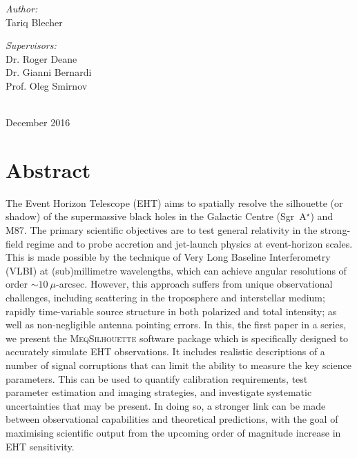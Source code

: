 \begin{titlepage}
\begin{minipage}{0.45\textwidth}
\begin{flushleft}\large 
\emph{Author:} \\
Tariq  {\sc Blecher}\\
\end{flushleft}
\end{minipage}
\begin{minipage}{0.45\textwidth}

\begin{flushright} \large
\emph{Supervisors:} \\
Dr. Roger {\sc Deane} \\
Dr. Gianni {\sc Bernardi} \\
Prof. Oleg {\sc Smirnov} \\
\end{flushright}
\end{minipage}\\[2cm]


{\large December 2016}

\end{titlepage}

\chapter*{Abstract}

 The Event Horizon Telescope (EHT) aims to spatially resolve the silhouette (or shadow) of the supermassive black holes in the Galactic Centre (Sgr~A$^\star$) and M87. The primary scientific objectives are to test general relativity in the strong-field regime and to probe accretion and jet-launch physics at event-horizon scales. This is made possible by the technique of Very Long Baseline Interferometry (VLBI) at (sub)millimetre wavelengths, which can achieve angular resolutions of order $\sim10~\mu$-arcsec. However, this approach suffers from unique observational challenges, including scattering in the troposphere and interstellar medium; rapidly time-variable source structure in both polarized and total intensity; as well as non-negligible antenna pointing errors. In this, the first paper in a series, we present the \textsc{MeqSilhouette} software package which is specifically designed to accurately simulate EHT observations. It includes realistic descriptions of a number of signal corruptions that can limit the ability to measure the key science parameters. This can be used to quantify calibration requirements, test parameter estimation and imaging strategies, and investigate systematic uncertainties that may be present. In doing so, a stronger link can be made between observational capabilities and theoretical predictions, with the goal of maximising scientific output from the upcoming order of magnitude increase in EHT sensitivity. 

